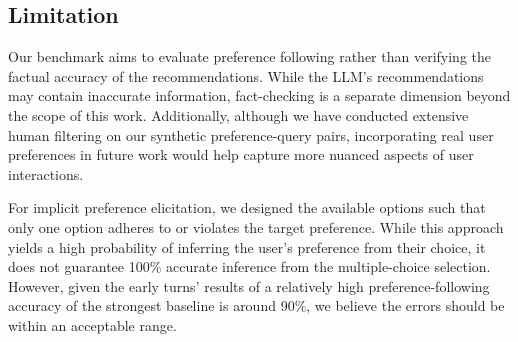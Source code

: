 \subsection{Limitation}
Our benchmark aims to evaluate preference following rather than verifying the factual accuracy of the recommendations. While the LLM's recommendations may contain inaccurate information, fact-checking is a separate dimension beyond the scope of this work. Additionally, although we have conducted extensive human filtering on our synthetic preference-query pairs, incorporating real user preferences in future work would help capture more nuanced aspects of user interactions.

For implicit preference elicitation, we designed the available options such that only one option adheres to or violates the target preference. While this approach yields a high probability of inferring the user's preference from their choice, it does not guarantee 100\% accurate inference from the multiple-choice selection. However, given the early turns' results of a relatively high preference-following accuracy of the strongest baseline is around 90\%, we believe the errors should be within an acceptable range.

